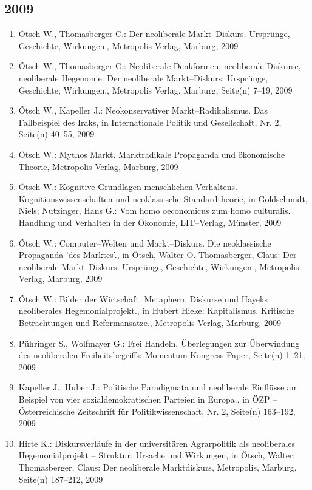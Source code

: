 \subsection*{2009}
\begin{enumerate}
    	 \item Ötsch W., Thomasberger C.: Der neoliberale Markt–Diskurs. Ursprünge, Geschichte, Wirkungen., Metropolis Verlag, Marburg, 2009
	 \item Ötsch W., Thomasberger C.: Neoliberale Denkformen, neoliberale Diskurse, neoliberale Hegemonie: Der neoliberale Markt--Diskurs. Ursprünge, Geschichte, Wirkungen., Metropolis Verlag, Marburg, Seite(n) 7--19, 2009
	 \item Ötsch W., Kapeller J.: Neokonservativer Markt--Radikalismus. Das Fallbeispiel des Iraks, in Internationale Politik und Gesellschaft, Nr. 2, Seite(n) 40--55, 2009
	 \item Ötsch W.: Mythos Markt. Marktradikale Propaganda und ökonomische Theorie, Metropolis Verlag, Marburg, 2009
	 \item Ötsch W.: Kognitive Grundlagen menschlichen Verhaltens. Kognitionswissenschaften und neoklassische Standardtheorie, in Goldschmidt, Niels; Nutzinger, Hans G.: Vom homo oeconomicus zum homo culturalis. Handlung und Verhalten in der Ökonomie, LIT--Verlag, Münster, 2009
	 \item Ötsch W.: Computer--Welten und Markt--Diskurs. Die neoklassische Propaganda 'des Marktes'., in Ötsch, Walter O. Thomasberger, Claus: Der neoliberale Markt--Diskurs. Ursprünge, Geschichte, Wirkungen., Metropolis Verlag, Marburg, 2009
	 \item Ötsch W.: Bilder der Wirtschaft. Metaphern, Diskurse und Hayeks neoliberales Hegemonialprojekt., in Hubert Hieke: Kapitalismus. Kritische Betrachtungen und Reformansätze., Metropolis Verlag, Marburg, 2009
	 \item Pühringer S., Wolfmayer G.: Frei Handeln. Überlegungen zur Überwindung des neoliberalen Freiheitsbegriffs: Momentum Kongress Paper, Seite(n) 1--21, 2009
	 \item Kapeller J., Huber J.: Politische Paradigmata und neoliberale Einflüsse am Beispiel von vier sozialdemokratischen Parteien in Europa., in ÖZP -- Österreichische Zeitschrift für Politikwissenschaft, Nr. 2, Seite(n) 163--192, 2009
	 \item Hirte K.: Diskursverläufe in der universitären Agrarpolitik als neoliberales Hegemonialprojekt – Struktur, Ursache und Wirkungen, in Ötsch, Walter; Thomasberger, Claus: Der neoliberale Marktdiskurs, Metropolis, Marburg, Seite(n) 187--212, 2009

\end{enumerate}
